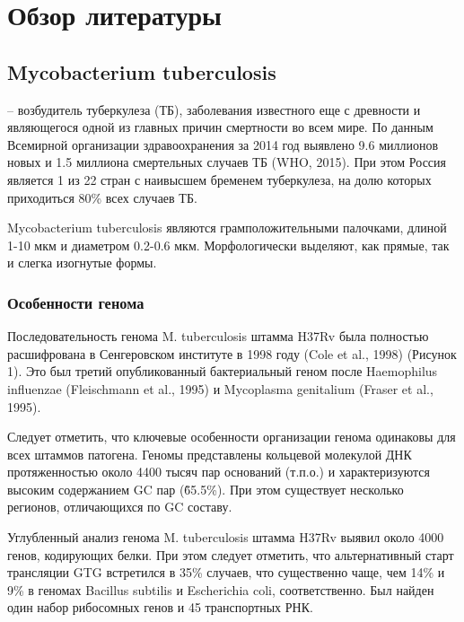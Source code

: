 \section{Обзор литературы}

\subsection{Mycobacterium tuberculosis}
 – возбудитель туберкулеза (ТБ), заболевания известного еще с древности и являющегося одной из главных причин смертности во всем мире. По данным Всемирной организации здравоохранения  за 2014 год выявлено 9.6 миллионов новых и 1.5 миллиона смертельных случаев ТБ (WHO, 2015). При этом Россия является 1 из 22 стран с наивысшем бременем туберкулеза, на долю которых приходиться 80\% всех случаев ТБ. 

Mycobacterium tuberculosis являются грамположительными палочками, длиной 1-10 мкм и диаметром 0.2-0.6 мкм. Морфологически выделяют, как прямые, так и слегка изогнутые формы.

\subsubsection{Особенности генома}
Последовательность генома M. tuberculosis штамма H37Rv была полностью расшифрована в Сенгеровском институте в 1998 году (Cole et al., 1998) (Рисунок 1). Это был третий опубликованный бактериальный геном после Haemophilus influenzae (Fleischmann et al., 1995) и Mycoplasma genitalium (Fraser et al., 1995).

Следует отметить, что ключевые особенности организации генома одинаковы для всех штаммов патогена. Геномы представлены кольцевой молекулой ДНК протяженностью около 4400 тысяч пар оснований (т.п.о.) и характеризуются высоким содержанием GC пар (\~ 65.5\%). При этом существует несколько регионов, отличающихся по GC составу.

Углубленный анализ генома M. tuberculosis штамма H37Rv выявил около 4000 генов, кодирующих белки. При этом следует отметить, что альтернативный старт трансляции GTG встретился в 35\% случаев, что существенно чаще, чем 14\% и 9\% в геномах Bacillus subtilis и Escherichia coli, соответственно. Был найден один набор рибосомных генов и 45 транспортных РНК.

